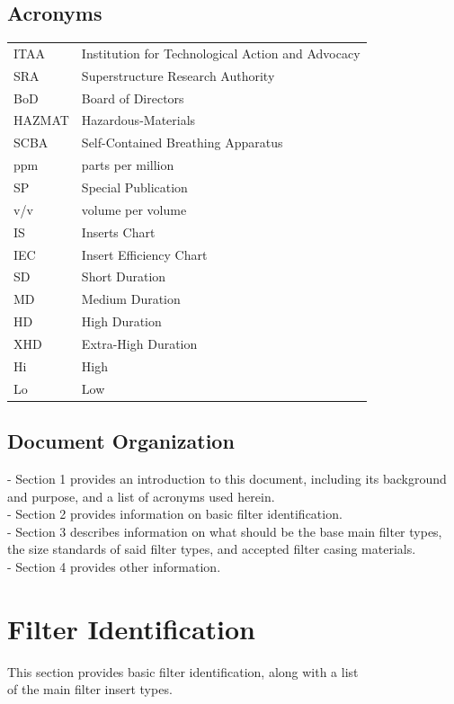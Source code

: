 \documentclass[a4paper, 12pt, oneside]{article}
\begin{document}
{	\subsection{Acronyms}
	\begin{tabular}{|p{2cm} p{10cm}}
		ITAA & Institution for Technological Action and Advocacy \\
		SRA & Superstructure Research Authority \\
		BoD & Board of Directors \\
		HAZMAT & Hazardous-Materials \\
		SCBA & Self-Contained Breathing Apparatus \\
		ppm & parts per million \\
		SP & Special Publication \\
		v/v & volume per volume \\
		IS & Inserts Chart \\
		IEC & Insert Efficiency Chart \\
		SD & Short Duration \\
		MD & Medium Duration \\
		HD & High Duration \\
		XHD & Extra-High Duration \\
		Hi & High \\
		Lo & Low \\
	\end{tabular}
		\subsection{Document Organization}
			- Section 1 provides an introduction to this document, including its background and purpose, and a list of acronyms used herein. \\
			- Section 2 provides information on basic filter identification. \\
			- Section 3 describes information on what should be the base main filter types, the size standards of said filter types, and accepted filter casing materials. \\
			- Section 4 provides other information.
			
	\newpage
			
	\section{Filter Identification}
		This section provides basic filter identification, along with a list \\
		of the main filter insert types.
}
\end{document}
